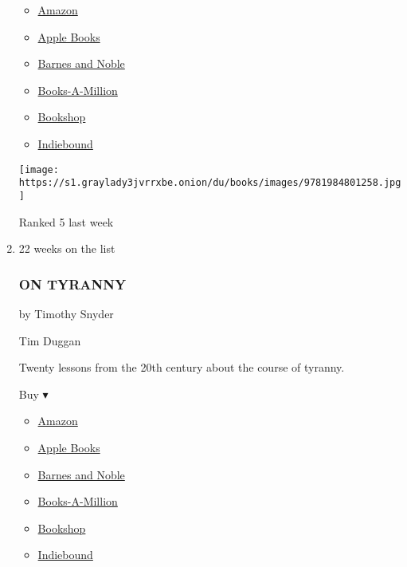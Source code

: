 \begin{enumerate}
  \begin{itemize}
  \tightlist
  \item
    \href{https://www.amazon.com/dp/1984801252?tag=NYTBSREV-20\&tag=NYTBS-20}{Amazon}
  \item
    \href{https://du-gae-books-dot-nyt-du-prd.appspot.com/buy?title=UNTAMED\&author=Glennon+Doyle}{Apple
    Books}
  \item
    \href{https://www.anrdoezrs.net/click-7990613-11819508?url=https\%3A\%2F\%2Fwww.barnesandnoble.com\%2Fw\%2F\%3Fean\%3D9781984801258}{Barnes
    and Noble}
  \item
    \href{https://www.anrdoezrs.net/click-7990613-35140?url=https\%3A\%2F\%2Fwww.booksamillion.com\%2Fp\%2FUNTAMED\%2FGlennon\%2BDoyle\%2F9781984801258}{Books-A-Million}
  \item
    \href{https://bookshop.org/a/3546/9781984801258}{Bookshop}
  \item
    \href{https://www.indiebound.org/book/9781984801258?aff=NYT}{Indiebound}
  \end{itemize}

  \texttt{[image: https://s1.graylady3jvrrxbe.onion/du/books/images/9781984801258.jpg]}

  Ranked 5 last week
\item
  22 weeks on the list

  \hypertarget{on-tyranny}{%
  \subsubsection{ON TYRANNY}\label{on-tyranny}}

  by Timothy Snyder

  Tim Duggan

  Twenty lessons from the 20th century about the course of tyranny.

  Buy ▾

  \begin{itemize}
  \tightlist
  \item
    \href{https://www.amazon.com/Tyranny-Twenty-Lessons-Twentieth-Century/dp/0804190119?tag=NYTBS-20}{Amazon}
  \item
    \href{https://du-gae-books-dot-nyt-du-prd.appspot.com/buy?title=ON+TYRANNY\&author=Timothy+Snyder}{Apple
    Books}
  \item
    \href{https://www.anrdoezrs.net/click-7990613-11819508?url=https\%3A\%2F\%2Fwww.barnesandnoble.com\%2Fw\%2F\%3Fean\%3D9780804190114}{Barnes
    and Noble}
  \item
    \href{https://www.anrdoezrs.net/click-7990613-35140?url=https\%3A\%2F\%2Fwww.booksamillion.com\%2Fp\%2FON\%2BTYRANNY\%2FTimothy\%2BSnyder\%2F9780804190114}{Books-A-Million}
  \item
    \href{https://bookshop.org/a/3546/9780804190114}{Bookshop}
  \item
    \href{https://www.indiebound.org/book/9780804190114?aff=NYT}{Indiebound}
  \end{itemize}


\end{enumerate}
